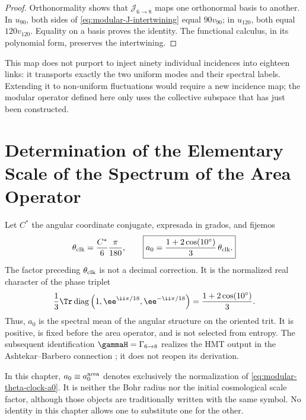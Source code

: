 \begin{proof}
Orthonormality shows that \(\mathcal J_{6\to8}\) maps one
orthonormal basis to another. In \(u_{90}\), both sides of
\cref{eq:modular-J-intertwining} equal \(90v_{90}\); in \(u_{120}\),
both equal \(120v_{120}\). Equality on a basis proves the identity.
The functional calculus, in its polynomial form, preserves the intertwining.
\end{proof}

This map does not purport to inject ninety individual incidences into
eighteen links: it transports exactly the two uniform modes and their
spectral labels. Extending it to non-uniform fluctuations would require
a new incidence map; the modular operator defined here only uses
the collective subspace that has just been constructed.

\section{Determination of the Elementary Scale of the Spectrum of the Area Operator}

Let \(C^*\) the angular coordinate conjugate, expresada in grados, and fijemos
\begin{equation}
\label{eq:modular-theta-clock-a0}
\theta_{\rm clk}=\frac{C^*}{6}\frac{\pi}{180},
\qquad
\boxed{
a_0=\frac{1+2\cos(10^\circ)}{3}\,\theta_{\rm clk}.}
\end{equation}
The factor preceding \(\theta_{\rm clk}\) is not a decimal
correction. It is the normalized real character of the phase triplet
\begin{equation}
\label{eq:modular-c10-character}
\frac13\Tr\operatorname{diag}
\left(1,\ee^{\ii\pi/18},\ee^{-\ii\pi/18}\right)
=\frac{1+2\cos(10^\circ)}3.
\end{equation}
Thus, \(a_0\) is the spectral mean of the angular structure on the oriented
trit. It is positive, is fixed before the area operator, and is not
selected from entropy. The subsequent identification
\(\gammaH=\Gamma_{6\to8}\) realizes the HMT output in the Ashtekar--Barbero connection
\cite{Barbero,Immirzi}; it does not reopen its derivation.

\begin{remark}
In this chapter, \(a_0\equiv a_0^{\rm area}\) denotes exclusively the
normalization of \cref{eq:modular-theta-clock-a0}. It is neither the Bohr radius
nor the initial cosmological scale factor, although those objects are traditionally written
with the same symbol. No identity in this chapter
allows one to substitute one for the other.
\end{remark}
